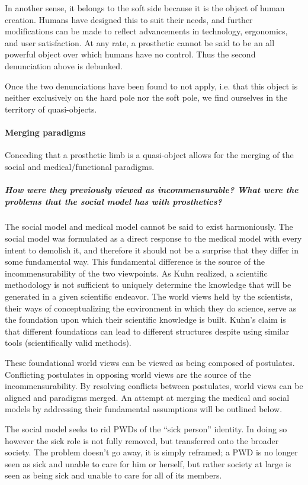 \documentclass[a4paper]{article}
\begin{document}
In another sense, it belongs to the soft side because it is the object of
human creation. Humans have designed this to suit their needs, and further
modifications can be made to reflect advancements in technology, ergonomics,
and user satisfaction. At any rate, a prosthetic cannot be said to be an all
powerful object over which humans have no control. Thus the second
denunciation above is debunked.

Once the two denunciations have been found to not apply, i.e. that this object
is neither exclusively on the hard pole nor the soft pole, we find ourselves
in the territory of quasi-objects.


\paragraph{Merging paradigms}

Conceding that a prosthetic limb is a quasi-object allows for the merging of
the social and medical/functional paradigms.


\subparagraph{How were they previously viewed as incommensurable? What were
the problems that the social model has with prosthetics?}

The social model and medical model cannot be said to exist harmoniously. The
social model was formulated as a direct response to the medical model with
every intent to demolish it, and therefore it should not be a surprise that
they differ in some fundamental way. This fundamental difference is the source
of the incommensurability of the two viewpoints. As Kuhn realized, a
scientific methodology is not sufficient to uniquely determine the knowledge
that will be generated in a given scientific endeavor. The world views held by
the scientists, their ways of conceptualizing the environment in which they do
science, serve as the foundation upon which their scientific knowledge is
built. Kuhn's claim is that different foundations can lead to different
structures despite using similar tools (scientifically valid methods).

These foundational world views can be viewed as being composed of postulates.
Conflicting postulates in opposing world views are the source of the
incommensurability. By resolving conflicts between postulates, world views can
be aligned and paradigms merged. An attempt at merging the medical and social
models by addressing their fundamental assumptions will be outlined below.

The social model seeks to rid PWDs of the ``sick person'' identity. In doing
so however the sick role is not fully removed, but transferred onto the
broader society. The problem doesn’t go away, it is simply reframed; a PWD is
no longer seen as sick and unable to care for him or herself, but rather
society at large is seen as being sick and unable to care for all of its
members.
\end{document}
